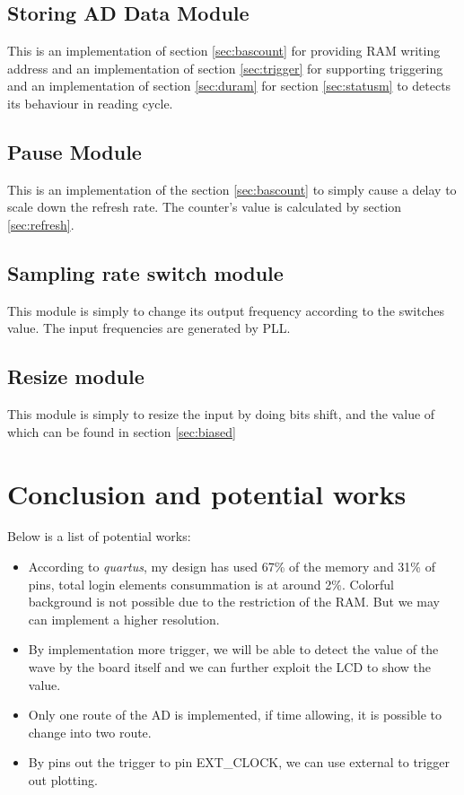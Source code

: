 \documentclass[11pt]{scrartcl}
\begin{document}
\subsection{Storing AD Data Module}
This is an implementation of section \ref{sec:bascount} for providing RAM writing address and an implementation of section \ref{sec:trigger} for supporting triggering and an implementation of section \ref{sec:duram} for section \ref{sec:statusm} to detects its behaviour in reading cycle.
\label{sec:fill}

\subsection{Pause Module}
This is an implementation of the section \ref{sec:bascount} to simply cause a delay to scale down the refresh rate. The counter's value is calculated by section \ref{sec:refresh}.
\label{sec:pause}

\subsection{Sampling rate switch module}

This module is simply to change its output frequency according to the switches value. The input frequencies are generated by PLL. 

\subsection{Resize module}

This module is simply to resize the input by doing bits shift, and the value of which can be found in section \ref{sec:biased}

\section{Conclusion and potential works}


Below is a list of potential works:
\begin{itemize}
\item According to \textit{quartus}, my design has used 67\% of the memory and 31\% of pins, total login elements consummation is at around 2\%. Colorful background is not possible due to the restriction of the RAM. But we may can implement a higher resolution.\\


\item By implementation more trigger, we will be able to detect the value of the wave by the board itself and we can further exploit the LCD to show the value.\\

\item Only one route of the AD is implemented, if time allowing, it is possible to change into two route.\\

\item By pins out the trigger to pin EXT\_CLOCK, we can use external to trigger out plotting.
\end{itemize}
\end{document}
